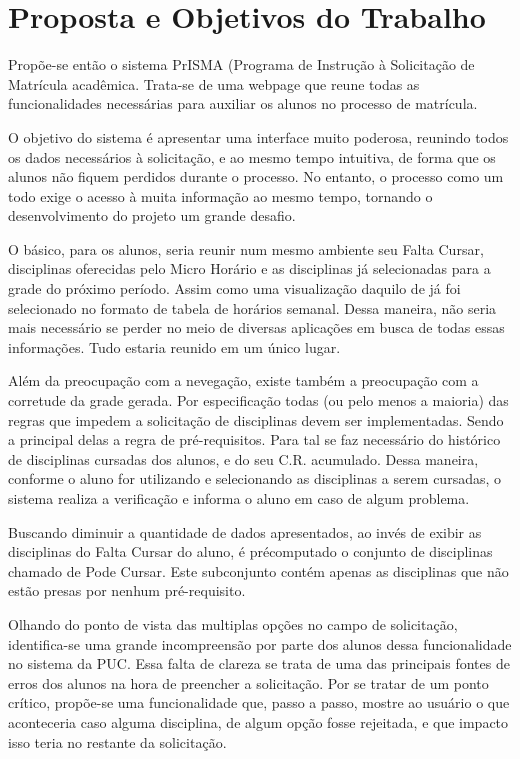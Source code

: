 
\chapter{Proposta e Objetivos do Trabalho}

Propõe-se então o sistema PrISMA (Programa de Instrução à Solicitação de Matrícula acadêmica. Trata-se de uma webpage que reune todas as funcionalidades necessárias para auxiliar os alunos no processo de matrícula.

O objetivo do sistema é apresentar uma interface muito poderosa, reunindo todos os dados necessários à solicitação, e ao mesmo tempo intuitiva, de forma que os alunos não fiquem perdidos durante o processo. No entanto, o processo como um todo exige o acesso à muita informação ao mesmo tempo, tornando o desenvolvimento do projeto um grande desafio.

O básico, para os alunos, seria reunir num mesmo ambiente seu Falta Cursar, disciplinas oferecidas pelo Micro Horário e as disciplinas já selecionadas para a grade do próximo período. Assim como uma visualização daquilo de já foi selecionado no formato de tabela de horários semanal. Dessa maneira, não seria mais necessário se perder no meio de diversas aplicações em busca de todas essas informações. Tudo estaria reunido em um único lugar.

Além da preocupação com a nevegação, existe também a preocupação com a corretude da grade gerada. Por especificação todas (ou pelo menos a maioria) das regras que impedem a solicitação de disciplinas devem ser implementadas. Sendo a principal delas a regra de pré-requisitos. Para tal se faz necessário do histórico de disciplinas cursadas dos alunos, e do seu C.R. acumulado. Dessa maneira, conforme o aluno for utilizando e selecionando as disciplinas a serem cursadas, o sistema realiza a verificação e informa o aluno em caso de algum problema.

Buscando diminuir a quantidade de dados apresentados, ao invés de exibir as disciplinas do Falta Cursar do aluno, é précomputado o conjunto de disciplinas chamado de Pode Cursar. Este subconjunto contém apenas as disciplinas que não estão presas por nenhum pré-requisito. 

Olhando do ponto de vista das multiplas opções no campo de solicitação, identifica-se uma grande incompreensão por parte dos alunos dessa funcionalidade no sistema da PUC. Essa falta de clareza se trata de uma das principais fontes de erros dos alunos na hora de preencher a solicitação. Por se tratar de um ponto crítico, propõe-se uma funcionalidade que, passo a passo, mostre ao usuário o que aconteceria caso alguma disciplina, de algum opção fosse rejeitada, e que impacto isso teria no restante da solicitação.

